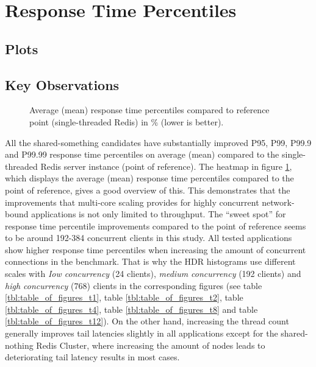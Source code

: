 \section{Response Time Percentiles}

\subsection{Plots}

\pagebreak

\subsection{Key Observations}
\begin{figure}
    \centering
    \scalebox{0.6}{}
    \caption{Average (mean) response time percentiles compared to reference point (single-threaded Redis) in \% (lower is better).}
    \label{fig:avg_latency_heat}
\end{figure}
All the shared-something candidates have substantially improved P95, P99, P99.9 and P99.99 response time percentiles on average (mean) compared to the single-threaded Redis server instance (point of reference). The heatmap in figure \ref{fig:avg_latency_heat}, which displays the average (mean) response time percentiles compared to the point of reference, gives a good overview of this. This demonstrates that the improvements that multi-core scaling provides for highly concurrent network-bound applications is not only limited to throughput. 
The “sweet spot” for response time percentile improvements compared to the point of reference seems to be around 192-384 concurrent clients in this study. All tested applications show higher response time percentiles when increasing the amount of concurrent connections in the benchmark. That is why the HDR histograms use different scales with \textit{Iow concurrency} (24 clients), \textit{medium concurrency} (192 clients) and \textit{high concurrency} (768) clients in the corresponding figures (see table \ref{tbl:table_of_figures_t1}, table \ref{tbl:table_of_figures_t2}, table \ref{tbl:table_of_figures_t4}, table \ref{tbl:table_of_figures_t8} and table \ref{tbl:table_of_figures_t12}).  \newline
On the other hand, increasing the thread count generally improves tail latencies slightly in all applications except for the shared-nothing Redis Cluster, where increasing the amount of nodes leads to deteriorating tail latency results in most cases. \newline 

